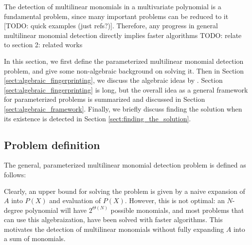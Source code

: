 The detection of multilinear monomials in a multivariate polynomial is a fundamental problem, 
since many important problems can be reduced to it [TODO: quick examples (just refs?)]. 
Therefore, any progress in general multilinear monomial detection directly implies 
faster algorithms
 TODO: relate to section 2: related works

In this section, we first define the parameterized multilinear monomial detection problem, 
and give some non-algebraic background on solving it. Then in Section \ref{sect:algebraic_fingerprinting}, 
we discuss the algebraic ideas by \citeauthor{KouWil15} \cite{Koutis08, Williams09, KouWil15}. 
Section \ref{sect:algebraic_fingerprinting} is long, but the overall idea as a 
general framework for parameterized problems is 
summarized and discussed in Section \ref{sect:algebraic_framework}. 
Finally, we briefly discuss finding the solution when its 
existence is detected in Section \ref{sect:finding_the_solution}.

\subsection{Problem definition}

The general, parameterized multilinear monomial detection problem is defined as follows: 

\begin{problem}
\end{problem}

Clearly, an upper bound for solving the problem is given by a 
naive expansion of $A$ into $P(X)$ and evaluation of $P(X)$.
However, this is not optimal: an $N$-degree polynomial will have $2^{\Theta(N)}$ 
possible monomials, and most problems that can use this algebraization, 
have been solved with faster algorithms. %
This motivates the detection of multilinear monomials 
without fully expanding $A$ into a sum of monomials.

